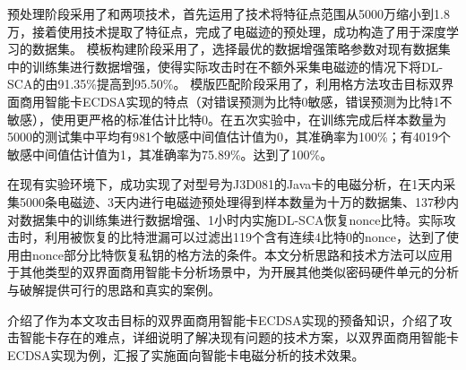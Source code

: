 {	预处理阶段采用了\poifanwei 和\yuchuli 两项技术，首先运用了\poifanwei 技术将特征点范围从5000万缩小到1.8万，接着使用\yuchuli 技术提取了特征点，完成了电磁迹的预处理，成功构造了用于深度学习的数据集。
	模板构建阶段采用了\shujuzengqiang，选择最优的数据增强策略参数对现有数据集中的训练集进行数据增强，使得实际攻击时在不额外采集电磁迹的情况下将DL-SCA的\zyx 由91.35\%提高到95.50\%。
	模版匹配阶段采用了\jiashejianyanguji ，利用格方法攻击目标双界面商用智能卡ECDSA实现的特点（对错误预测为比特0敏感，错误预测为比特1不敏感），使用更严格的标准估计比特0。在五次实验中，在训练完成后样本数量为5000的测试集中平均有981个敏感中间值估计值为0，其准确率为100\%；有4019个敏感中间值估计值为1，其准确率为75.89\%。\zyx 达到了100\%。
	
	
	在现有实验环境下，成功实现了对型号为J3D081的Java卡的电磁分析，在1天内采集5000条电磁迹、3天内进行电磁迹预处理得到样本数量为十万的数据集、137秒内对数据集中的训练集进行数据增强、1小时内实施DL-SCA恢复nonce比特。实际攻击时，利用被恢复的比特泄漏可以过滤出119个含有连续4比特0的nonce，达到了使用由nonce部分比特恢复私钥的格方法的条件。本文分析思路和技术方法可以应用于其他类型的双界面商用智能卡分析场景中，为开展其他类似密码硬件单元的分析与破解提供可行的思路和真实的案例。
	
	介绍了作为本文攻击目标的双界面商用智能卡ECDSA实现的预备知识，介绍了攻击智能卡存在的难点，详细说明了解决现有问题的技术方案，以双界面商用智能卡ECDSA实现为例，汇报了实施面向智能卡电磁分析的技术效果。
	

}
